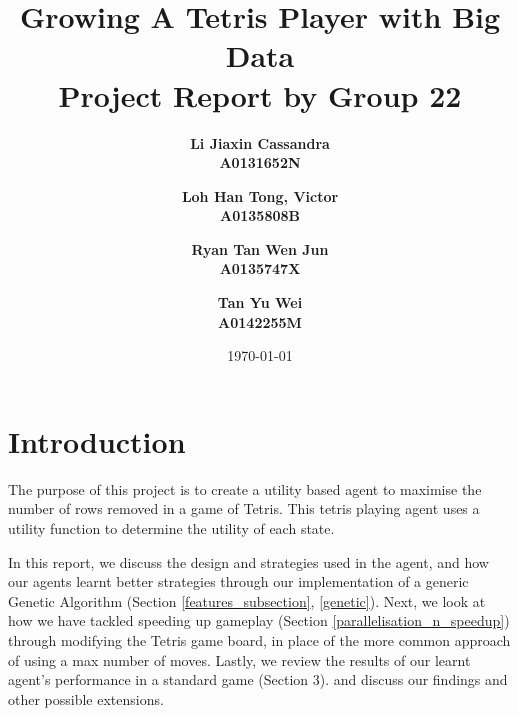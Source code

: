 \documentclass[a4paper,12pt,twocolumn]{article}
\begin{document}

\title{
    Growing A Tetris Player with Big Data\\
    \large Project Report by Group 22
}
\author{
    \bf{Li Jiaxin Cassandra}\\ 
    A0131652N
    \and
    \bf{Loh Han Tong, Victor}\\
    A0135808B
    \and
    \bf{Ryan Tan Wen Jun}\\
    A0135747X
    \and
    \bf{Tan Yu Wei}\\
    A0142255M
}
\date{\today}
\maketitle

\section{Introduction}
The purpose of this project is to create a utility based agent to maximise the
number of rows removed in a game of Tetris. This tetris playing agent uses a utility
function to determine the utility of each state.


In this report, we discuss the design and strategies used in the agent, and how our
agents learnt better strategies through our implementation of a generic Genetic
Algorithm (Section \ref{features_subsection}, \ref{genetic}).
Next, we look at how we have tackled speeding up gameplay (Section \ref{parallelisation_n_speedup}) through
modifying the Tetris game board, in place of the more common approach of using a
max number of moves. 
Lastly, we review the results of our learnt agent's performance in a standard game (Section 3).
and discuss our findings and other possible extensions.

\end{document}
